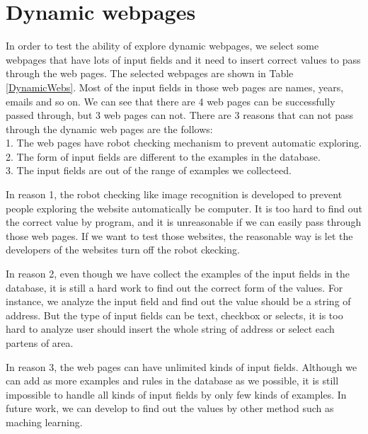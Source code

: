
\clearpage

\section{Dynamic webpages}

In order to test the ability of explore dynamic webpages,
we select some webpages that have lots of input fields and it need to insert correct values to pass through the web pages.
The selected webpages are shown in Table \ref{DynamicWebs}.
Most of the input fields in those web pages are names, years, emails and so on.
We can see that there are 4 web pages can be successfully passed through, but 3 web pages can not.
There are 3 reasons that can not pass through the dynamic web pages are the follows:
\\	1. The web pages have robot checking mechanism to prevent automatic exploring.
\\	2. The form of input fields are different to the examples in the database.
\\	3. The input fields are out of the range of examples we collecteed.
	
In reason 1, the robot checking like image recognition is developed to prevent people exploring the website automatically be computer.
It is too hard to find out the correct value by program,
and it is unreasonable if we can easily pass through those web pages.
If we want to test those websites,
the reasonable way is let the developers of the websites turn off the robot ckecking.

In reason 2, even though we have collect the examples of the input fields in the database, 
it is still a hard work to find out the correct form of the values.
For instance, we analyze the input field and find out the value should be a string of address.
But the type of input fields can be text, checkbox or selects, 
it is too hard to analyze user should insert the whole string of address or select each partens of area.

In reason 3, the web pages can have unlimited kinds of input fields.
Although we can add as more examples and rules in the database as we possible,
it is still impossible to handle all kinds of input fields by only few kinds of examples.
In future work, we can develop to find out the values by other method such as maching learning.

